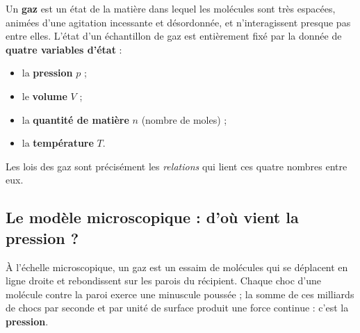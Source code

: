 \documentclass[11pt,a4paper]{article}
\begin{document}
\begin{definition}
Un \textbf{gaz} est un état de la matière dans lequel les molécules sont très espacées, animées d'une
agitation incessante et désordonnée, et n'interagissent presque pas entre elles. L'état d'un
échantillon de gaz est entièrement fixé par la donnée de \textbf{quatre variables d'état} :
\begin{itemize}[leftmargin=1.6em,topsep=2pt,itemsep=1.5pt]
  \item la \textcolor{pcol}{\textbf{pression}} $p$ ;
  \item le \textcolor{vcol}{\textbf{volume}} $V$ ;
  \item la \textcolor{ncol}{\textbf{quantité de matière}} $n$ (nombre de moles) ;
  \item la \textcolor{tcol}{\textbf{température}} $T$.
\end{itemize}
Les lois des gaz sont précisément les \emph{relations} qui lient ces quatre nombres entre eux.
\end{definition}

\subsection{Le modèle microscopique : d'où vient la pression ?}

À l'échelle microscopique, un gaz est un essaim de molécules qui se déplacent en ligne droite et
rebondissent sur les parois du récipient. Chaque choc d'une molécule contre la paroi exerce une
minuscule poussée ; la somme de ces milliards de chocs par seconde et par unité de surface produit
une force continue : c'est la \textbf{pression}.

\begin{center}
\end{center}
\end{document}
